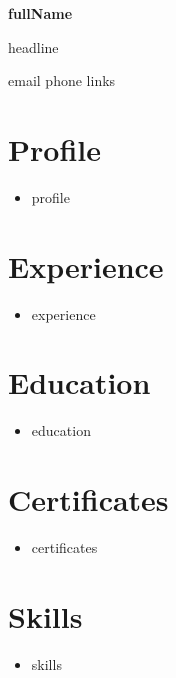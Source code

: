 \documentclass[letterpaper,11pt]{article}
\begin{document}
{\centering
  {\Huge\bfseries {{fullName}}}\par
  \vspace{2pt}
  {\large\color{accent} {{headline}}}\par
  \vspace{2pt}
  {\small {{email}} \textbar{} {{phone}} \textbar{} {{links}}}\par
}
\vspace{6pt}

\section{Profile}
{\obeylines
\begin{itemize}[leftmargin=0.2in, label={}, itemsep=2pt]
  \item {{profile}}
\end{itemize}
}

\section{Experience}
{\obeylines
\begin{itemize}[leftmargin=0.2in, label={}, itemsep=2pt]
  \item {{experience}}
\end{itemize}
}

\section{Education}
{\obeylines
\begin{itemize}[leftmargin=0.2in, label={}, itemsep=2pt]
  \item {{education}}
\end{itemize}
}

\section{Certificates}
{\obeylines
\begin{itemize}[leftmargin=0.2in, label={}, itemsep=2pt]
  \item {{certificates}}
\end{itemize}
}

\section{Skills}
{\obeylines
\begin{itemize}[leftmargin=0.2in, label={}, itemsep=2pt]
  \item {{skills}}
\end{itemize}
}
\end{document}
